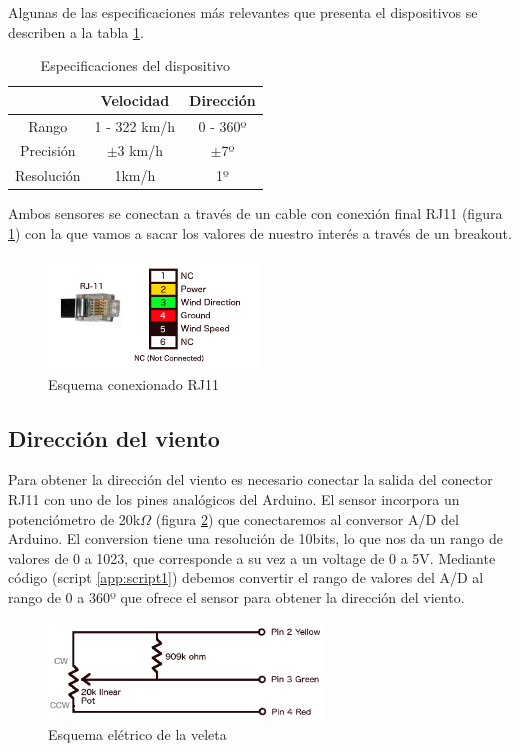 \documentclass[a4paper, 11pt]{article}
\begin{document}
Algunas de las especificaciones más relevantes que presenta el dispositivos se describen a la tabla 	\ref{tab:specifications}.

\begin{table}[h]
\center
\begin{tabular}{| c | c | c |}
\hline
& \textbf{Velocidad} & \textbf{Dirección} \\
\hline
Rango & 1 - 322 km/h & 0 - 360º \\
\hline
Precisión & $\pm$3 km/h & $\pm$7º \\
\hline
Resolución & 1km/h & 1º\\
\hline
\end{tabular}
\caption{Especificaciones del dispositivo}
\label{tab:specifications}
\end{table}

Ambos sensores se conectan a través de un cable con conexión final RJ11 (figura \ref{fig:rj11}) con la que vamos a sacar los valores de nuestro interés a través de un breakout. 

\begin{figure}[h]
	\center
	\includegraphics[width=0.5\textwidth]{img/rj11.png}
	\caption{Esquema conexionado RJ11}
	\label{fig:rj11}
\end{figure}
\newpage

\subsection{Dirección del viento}
Para obtener la dirección del viento es necesario conectar la salida del conector RJ11 con uno de los pines analógicos del Arduino. El sensor incorpora un potenciómetro de 20k$\Omega$ (figura \ref{fig:schema}) que conectaremos al conversor A/D del Arduino. El conversion tiene una resolución de 10bits, lo que nos da un rango de valores de 0 a 1023, que corresponde a su vez a un voltage de 0 a 5V. Mediante código (script \ref{app:script1}) debemos convertir el rango de valores del A/D al rango de 0 a 360º que ofrece el sensor para obtener la dirección del viento.

\begin{figure}[h]
	\center
	\includegraphics[width=0.65\textwidth]{img/schema.png}
	\caption{Esquema elétrico de la veleta}
	\label{fig:schema}
\end{figure}
\end{document}
